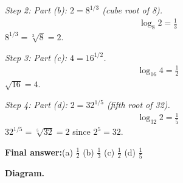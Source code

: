 \documentclass[11pt]{article}
\begin{document}
\textit{Step 2: Part (b): \( 2 = 8^{1/3} \) (cube root of 8).}
\[\begin{gathered}
\log_8 2 = \frac{1}{3}
\end{gathered}\]
\( 8^{1/3} = \sqrt[3]{8} = 2 \).

\textit{Step 3: Part (c): \( 4 = 16^{1/2} \).}
\[\begin{gathered}
\log_{16} 4 = \frac{1}{2}
\end{gathered}\]
\( \sqrt{16} = 4 \).

\textit{Step 4: Part (d): \( 2 = 32^{1/5} \) (fifth root of 32).}
\[\begin{gathered}
\log_{32} 2 = \frac{1}{5}
\end{gathered}\]
\( 32^{1/5} = \sqrt[5]{32} = 2 \) since \( 2^5 = 32 \).

\begin{answerbox}
\textbf{Final answer:}\quad (a) \(\displaystyle  \frac{1}{2} \) \quad  (b) \(\displaystyle  \frac{1}{3} \) \quad  (c) \(\displaystyle  \frac{1}{2} \) \quad  (d) \(\displaystyle  \frac{1}{5} \)
\end{answerbox}
\textbf{Diagram.}
\end{document}
